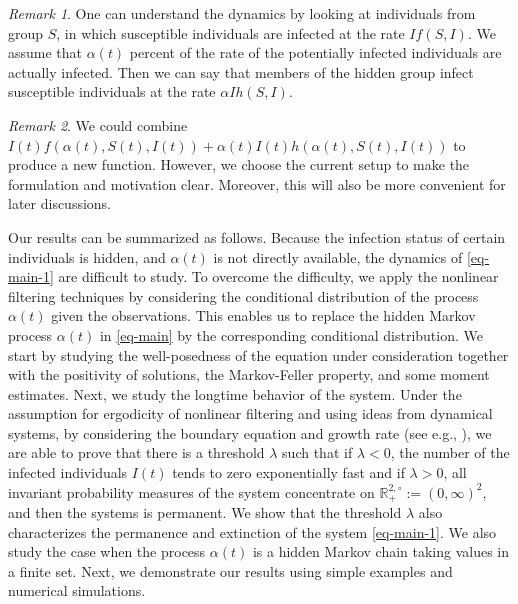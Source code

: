 \documentclass[12pt]{amsart}
\theoremstyle{remark}
\newtheorem{rem}{Remark}
\numberwithin{equation}{section}
\numberwithin{equation}{section}
\newcommand{\1}{\boldsymbol{1}}
\begin{document}
\begin{rem}
One can understand the dynamics by looking at individuals from group $S$, in which
susceptible individuals are infected at the rate $If(S,I)$.
We assume that $\alpha(t)$ percent of the rate of the potentially infected individuals are actually infected. Then we can say that members of the hidden group infect susceptible individuals at the rate $\alpha I h(S,I)$.
\end{rem}
\begin{rem}
We could combine $I(t)f(\alpha(t),S(t),I(t))+\alpha(t) I(t) h(\alpha(t),S(t),I(t))$ to
produce  a new function. However, we choose the current setup
 to make
the formulation and motivation clear. Moreover, this will also be more convenient for later discussions.
\end{rem}

Our results can be summarized as follows.
Because the infection status of certain individuals is hidden,
and
$\alpha(t)$ is not directly available,
the dynamics of \eqref{eq-main-1} are difficult to study.
To overcome the
difficulty, we apply the nonlinear filtering techniques by considering the conditional distribution of the process $\alpha(t)$ given the observations. This enables us to
replace the hidden Markov process $\alpha(t)$ in
\eqref{eq-main}
by
the corresponding conditional distribution.
We start by studying the well-posedness of the equation under consideration together with the positivity of solutions, the Markov-Feller property, and some moment estimates. Next, we study the longtime behavior of the system.
Under the assumption for ergodicity of nonlinear filtering  \cite{Han09,Kun71} and using ideas from dynamical systems, by considering the boundary equation and growth rate (see e.g., \cite{DANG,DN-JDE,HN18}), we are able to prove that
there is a threshold $\lambda$ such that if $\lambda<0$, the number of the infected individuals $I(t)$ tends to zero
exponentially fast
and if $\lambda>0$, all invariant probability measures of the system concentrate on $\mathbb{R}_+^{2,\circ}:=(0,\infty)^2$, and then the systems is permanent.
We show that the threshold $\lambda$ also characterizes
the permanence and extinction of the system \eqref{eq-main-1}.
 We also study the case when the process $\alpha(t)$ is a hidden Markov chain
 taking values in a finite set.
 Next, we demonstrate our results using
 simple examples and numerical simulations.
\end{document}
